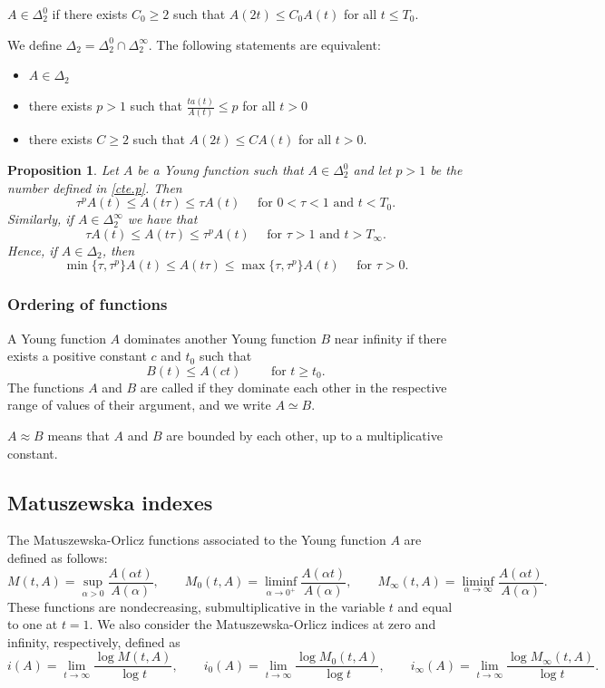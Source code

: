 \documentclass[12pt,reqno]{amsart}
\newtheorem{prop}[thm]{Proposition}
\theoremstyle{definition}
\theoremstyle{remark}
\numberwithin{equation}{section}
\begin{document}
\noindent $A\in \Delta_2^0$ if there exists $C_0\geq 2$ such that
$A(2t) \leq C_0 A(t)$ for all $t\leq T_0$.

\medskip
\noindent We define $\Delta_2 = \Delta_2^0\cap \Delta_2^\infty$. The following statements are equivalent:
\begin{itemize}
\item[i)] $A\in \Delta_2$
\item[ii)] there exists $p>1$ such that $\frac{ta(t)}{A(t)} \le p$ for all $t>0$
\item[iii)] there exists $C\geq 2$ such that $A(2t) \leq C A(t)$ for all $t>0$.
\end{itemize}


\begin{prop}
Let $A$ be a Young function such that $A\in \Delta_2^0$ and let $p>1$ be the number defined in \eqref{cte.p}. Then
$$
\tau^p A(t) \leq A(t\tau)\leq 	\tau A(t) \quad \text{ for } 0<\tau <1 \text{ and } t<T_0.
$$
Similarly, if $A\in \Delta_2^\infty$ we have that
$$
\tau  A(t) \leq A(t\tau)\leq 	\tau^p A(t) \quad \text{ for } \tau >1 \text{ and } t>T_\infty.
$$
Hence, if $A\in \Delta_2$, then
$$
\min\{\tau,\tau^p\} A(t)\leq A(t\tau) \leq \max\{\tau, \tau^p\} A(t) \quad \text{ for } \tau>0.
$$
\end{prop}

\subsubsection{Ordering  of functions}
A Young function $A$ dominates another Young function $B$ near infinity if there exists a positive constant $c$ and $t_0$ such that
$$
B(t)\leq A(ct) \qquad \text{ for }t\geq t_0.
$$
The functions $A$ and $B$ are called  if they dominate each other in the respective range of values of their argument, and we write $A \simeq B$.

$A\approx B$ means that $A$ and $B$ are bounded by each other, up to a multiplicative constant.


\subsection{Matuszewska indexes} \label{sec.matu}
The Matuszewska-Orlicz functions associated to the Young function $A$ are defined as follows:
$$
M(t,A)=\sup_{\alpha>0} \frac{A(\alpha t)}{A(\alpha)}, \qquad M_0(t,A)=\liminf_{\alpha\to 0^+} \frac{A(\alpha t)}{A(\alpha)},\qquad 
M_\infty(t,A)=\liminf_{\alpha\to\infty} \frac{A(\alpha t)}{A(\alpha)}.
$$
These functions are nondecreasing, submultiplicative in the variable $t$ and equal to one at $t=1$. We also consider the Matuszewska-Orlicz indices at zero and infinity, respectively,  defined as
$$
i (A)= \lim_{t\to\infty} \frac{\log M (t,A)}{\log t}, \qquad i_0 (A)= \lim_{t\to \infty} \frac{\log M_0 (t,A)}{\log t}, \qquad i_\infty (A)= \lim_{t\to\infty} \frac{\log M_\infty (t,A)}{\log t}.
$$
\end{document}
